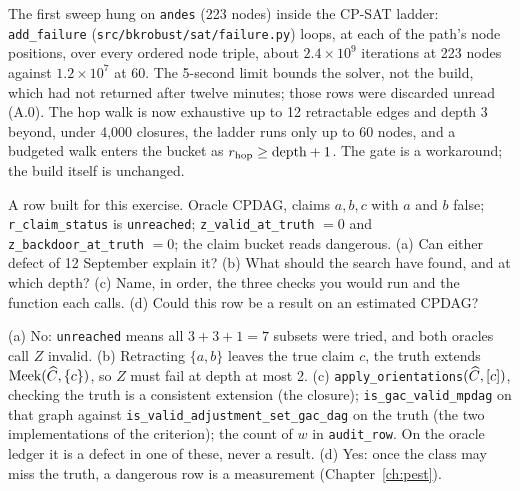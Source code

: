 \begin{digressao}
The first sweep hung on \texttt{andes} (223 nodes) inside the CP-SAT ladder: \texttt{add\_failure}
(\texttt{src/bkrobust/sat/failure.py}) loops, at each of the path's node positions, over every ordered
node triple, about $2.4 \times 10^{9}$ iterations at 223 nodes against $1.2 \times 10^{7}$ at 60. The
5-second limit bounds the solver, not the build, which had not returned after twelve minutes; those rows
were discarded unread (A.0). The hop walk is now exhaustive up to 12 retractable edges and depth 3
beyond,
under 4,000 closures, the ladder runs only up to 60 nodes, and a budgeted walk enters the bucket as
$r_{\mathrm{hop}} \ge \text{depth}+1$. The gate is a workaround; the build itself is unchanged.
\end{digressao}


\begin{exercicio}[metodo=diagnosis,conceito=gatilho-inspecao]
A row built for this exercise. Oracle CPDAG, claims $a, b, c$ with $a$ and $b$ false;
\texttt{r\_claim\_status} is \texttt{unreached}; \texttt{z\_valid\_at\_truth} $= 0$ and
\texttt{z\_backdoor\_at\_truth} $= 0$; the claim bucket reads dangerous. (a) Can either defect of 12
September explain it? (b) What should the search have found, and at which depth? (c) Name, in order, the
three checks you would run and the function each calls. (d) Could this row be a result on an estimated
CPDAG?
\end{exercicio}
\begin{solucao}
(a) No: \texttt{unreached} means all $3 + 3 + 1 = 7$ subsets were tried, and both oracles call $Z$
invalid. (b) Retracting $\{a, b\}$ leaves the true claim $c$, the truth extends
$\mathrm{Meek}(\widehat{C}, \{c\})$, so $Z$ must fail at depth at most 2. (c)
\texttt{apply\_orientations}$(\widehat{C},
[c])$, checking the truth is a consistent extension (the closure); \texttt{is\_gac\_valid\_mpdag} on
that
graph against \texttt{is\_valid\_adjustment\_set\_gac\_dag} on the truth (the two implementations of the
criterion); the count of $w$ in \texttt{audit\_row}. On the oracle ledger it is a defect in one of
these,
never a result. (d) Yes: once the class may miss the truth, a dangerous row is a measurement
(Chapter~\ref{ch:pest}).
\end{solucao}

